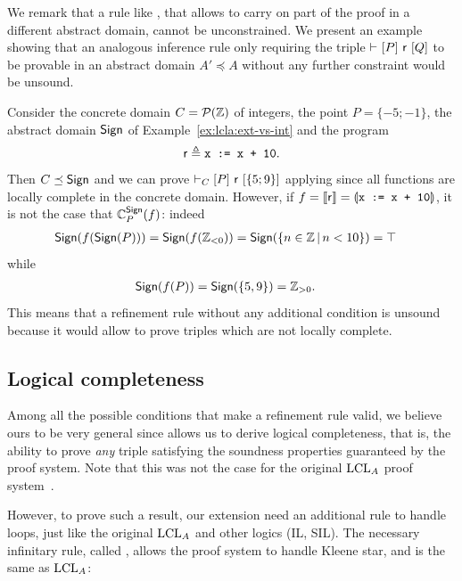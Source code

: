 We remark that a rule like , that allows to carry on part of the proof in a different abstract domain, cannot be unconstrained. We present an example showing that an analogous inference rule only requiring the triple $\vdash_{}\nobreak[P]~\mathsf{r}~[Q]$ to be provable in an abstract domain $A' \preceq A$ without any further constraint would be unsound.
\begin{example}
	Consider the concrete domain $C = \mathcal{P}(\mathbb{Z})$ of integers, the point $P = \{ -5; -1 \}$, the abstract domain $\mathsf{Sign}$ of Example~\ref{ex:lcla:ext-vs-int} and the program
	\[
	\mathsf{r} \triangleq \texttt{x := x + 10} .
	\]
	Then $C \preceq \mathsf{Sign}$ and we can prove $\vdash_{C}\nobreak[P]~\mathsf{r}~[\{ 5; 9 \}]$ applying  since all functions are locally complete in the concrete domain. However, if $f = \llbracket\mathsf{r}\rrbracket = \llparenthesis\texttt{x := x + 10}\rrparenthesis$, it is not the case that $\mathbb{C}^{\mathsf{Sign}}_{P}(f)$: indeed
	\begin{align*}
		\mathsf{Sign} (f (\mathsf{Sign}(P))) & = \mathsf{Sign} (f(\mathbb{Z}_{< 0})) = \mathsf{Sign}(\{ n \in \mathbb{Z} \,\vert\, n < 10 \}) = \top
	\end{align*}
	while
	\begin{align*}
		\mathsf{Sign}(f(P)) & = \mathsf{Sign}(\{ 5, 9 \}) = \mathbb{Z}_{> 0}.
	\end{align*}
	This means that a refinement rule without any additional condition is unsound because it would allow to prove triples which are not locally complete.
\end{example}

\subsection{Logical completeness}\label{sec:logical-completeness}
Among all the possible conditions that make a refinement rule valid, we believe ours to be very general since  allows us to derive logical completeness, that is, the ability to prove \emph{any} triple satisfying the soundness properties guaranteed by the proof system. Note that this was not the case for the original $\text{LCL}_A$ proof system~\cite[§5.2]{BGGR21}.

However, to prove such a result, our extension need an additional rule to handle loops, just like the original $\text{LCL}_A$ and other logics (IL, SIL).
The necessary infinitary rule, called , allows the proof system to handle Kleene star, and is the same as $\text{LCL}_A$:


